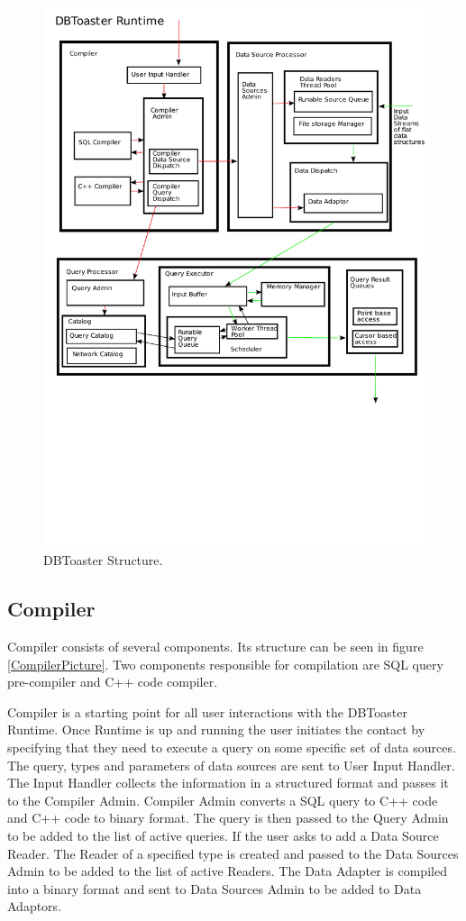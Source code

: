 \documentclass[14pt]{article}
\begin{document}
\begin{figure}
  \includegraphics[width=4.50in]{../figures/DBToasterRuntime.pdf}
  \caption{DBToaster Structure.}
  \label{DBToasterPic}
\end{figure}



\subsection{Compiler}

Compiler consists of several components. Its structure can be seen in figure \ref{CompilerPicture}. Two components responsible for compilation are SQL query pre-compiler and C++ code compiler. 

Compiler is a starting point for all user interactions with the DBToaster Runtime. Once Runtime is up and running the user initiates the contact by specifying that they need to execute a query on some specific set of data sources. The query, types and parameters of data sources are sent to User Input Handler. The Input Handler collects the information in a structured format and passes it to the Compiler Admin. Compiler Admin converts a SQL query to C++ code and C++ code to binary format. The query is then passed to the Query Admin to be added to the list of active queries. If the user asks to add a Data Source Reader. The Reader of a specified type is created and passed to the Data Sources Admin to be added to the list of active Readers. The Data Adapter is compiled into a binary format and sent to Data Sources Admin to be added to Data Adaptors. 
\end{document}

